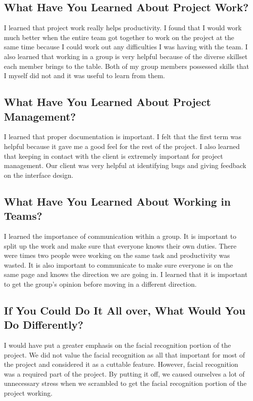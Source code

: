 \documentclass[10pt, onecolumn, twoside, peerreview]{IEEEtran}
\begin{document}
\subsection{What Have You Learned About Project Work?}
I learned that project work really helps productivity. I found that I would work much better when the entire team got together to work on the project at the same time because I could work out any difficulties I was having with the team. I also learned that working in a group is very helpful because of the diverse skillset each member brings to the table. Both of my group members possessed skills that I myself did not and it was useful to learn from them.

\subsection{What Have You Learned About Project Management?}
I learned that proper documentation is important. I felt that the first term was helpful because it gave me a good feel for the rest of the project. I also learned that keeping in contact with the client is extremely important for project management. Our client was very helpful at identifying bugs and giving feedback on the interface design.

\subsection{What Have You Learned About Working in Teams?}
I learned the importance of communication within a group. It is important to split up the work and make sure that everyone knows their own duties. There were times two people were working on the same task and productivity was wasted. It is also important to communicate to make sure everyone is on the same page and knows the direction we are going in. I learned that it is important to get the group's opinion before moving in a different direction.

\subsection{If You Could Do It All over, What Would You Do Differently?}
I would have put a greater emphasis on the facial recognition portion of the project. We did not value the facial recognition as all that important for most of the project and considered it as a cuttable feature. However, facial recognition was a required part of the project. By putting it off, we caused ourselves a lot of unnecessary stress when we scrambled to get the facial recognition portion of the project working.
\end{document}
